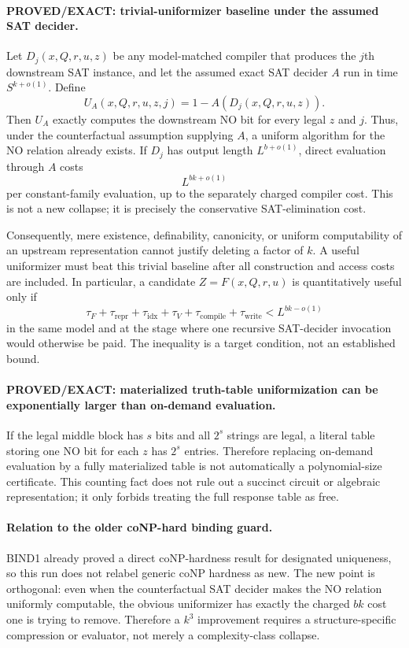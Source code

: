 \documentclass[11pt]{article}
\begin{document}
\paragraph{PROVED/EXACT: trivial-uniformizer baseline under the assumed SAT decider.}
Let $D_j(x,Q,r,u,z)$ be any model-matched compiler that produces the $j$th downstream SAT instance, and let the assumed exact SAT decider $A$ run in time $S^{k+o(1)}$. Define
\[
U_A(x,Q,r,u,z,j)=1-A(D_j(x,Q,r,u,z)).
\]
Then $U_A$ exactly computes the downstream NO bit for every legal $z$ and $j$. Thus, under the counterfactual assumption supplying $A$, a uniform algorithm for the NO relation already exists. If $D_j$ has output length $L^{b+o(1)}$, direct evaluation through $A$ costs
\[
\boxed{L^{bk+o(1)}}
\]
per constant-family evaluation, up to the separately charged compiler cost. This is not a new collapse; it is precisely the conservative SAT-elimination cost.

Consequently, mere existence, definability, canonicity, or uniform computability of an upstream representation cannot justify deleting a factor of $k$. A useful uniformizer must beat this trivial baseline after all construction and access costs are included. In particular, a candidate $Z=F(x,Q,r,u)$ is quantitatively useful only if
\[
\tau_F+\tau_{\mathrm{repr}}+\tau_{\mathrm{idx}}+\tau_V+\tau_{\mathrm{compile}}+\tau_{\mathrm{write}}< L^{bk-o(1)}
\]
in the same model and at the stage where one recursive SAT-decider invocation would otherwise be paid. The inequality is a target condition, not an established bound.

\paragraph{PROVED/EXACT: materialized truth-table uniformization can be exponentially larger than on-demand evaluation.}
If the legal middle block has $s$ bits and all $2^s$ strings are legal, a literal table storing one NO bit for each $z$ has $2^s$ entries. Therefore replacing on-demand evaluation by a fully materialized table is not automatically a polynomial-size certificate. This counting fact does not rule out a succinct circuit or algebraic representation; it only forbids treating the full response table as free.

\paragraph{Relation to the older coNP-hard binding guard.}
BIND1 already proved a direct coNP-hardness result for designated uniqueness, so this run does not relabel generic coNP hardness as new. The new point is orthogonal: even when the counterfactual SAT decider makes the NO relation uniformly computable, the obvious uniformizer has exactly the charged $bk$ cost one is trying to remove. Therefore a $k^3$ improvement requires a structure-specific compression or evaluator, not merely a complexity-class collapse.
\end{document}

